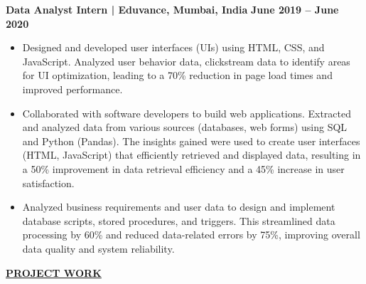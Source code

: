 \documentclass{article}
\begin{document}
\noindent \textbf{Data Analyst Intern | Eduvance, Mumbai, India}  \hfill \textbf{June 2019 – June 2020}
\begin{itemize}[noitemsep,nolistsep,leftmargin=*]
\item {\small Designed and developed user interfaces (UIs) using HTML, CSS, and JavaScript. Analyzed user behavior data, clickstream data to identify areas for UI optimization, leading to a 70\% reduction in page load times and improved performance.}
\item {\small Collaborated with software developers to build web applications. Extracted and analyzed data from various sources (databases, web forms) using SQL and Python (Pandas). The insights gained were used to create user interfaces (HTML, JavaScript) that efficiently retrieved and displayed data, resulting in a 50\% improvement in data retrieval efficiency and a 45\% increase in user satisfaction.}
\item {\small Analyzed business requirements and user data to design and implement database scripts, stored procedures, and triggers. This streamlined data processing by 60\% and reduced data-related errors by 75\%, improving overall data quality and system reliability.}
\end{itemize}

\vspace{2mm}
\noindent \textbf{\underline{PROJECT WORK}} 
\end{document}
